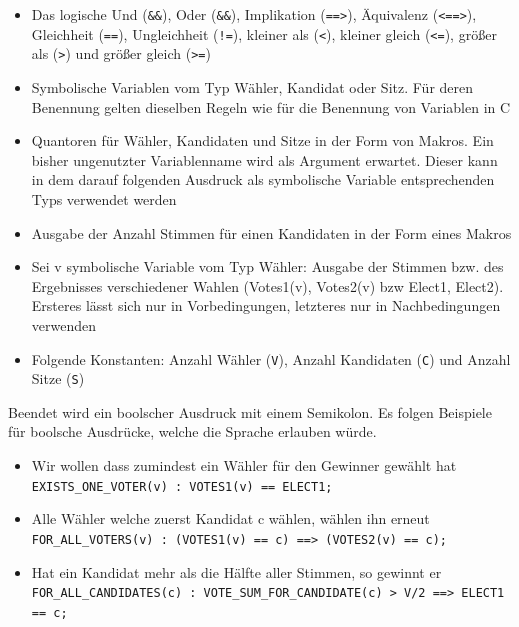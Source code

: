 \documentclass[a4paper]{scrreprt}
\begin{document}
\begin{itemize}
\item Das logische Und (\verb!&&!), Oder (\verb!&&!), Implikation (\verb!==>!), Äquivalenz (\verb!<==>!), Gleichheit (\verb!==!), Ungleichheit (\texttt{!=}), kleiner als (\texttt{<}), kleiner gleich (\texttt{<=}), größer als (\texttt{>}) und größer gleich (\texttt{>=})
\item Symbolische Variablen vom Typ Wähler, Kandidat oder Sitz. Für deren Benennung gelten dieselben Regeln wie für die Benennung von Variablen in C
\item Quantoren für Wähler, Kandidaten und Sitze in der Form von Makros. Ein bisher ungenutzter Variablenname wird als Argument erwartet. Dieser kann in dem darauf folgenden Ausdruck als symbolische Variable entsprechenden Typs verwendet werden
\item Ausgabe der Anzahl Stimmen für einen Kandidaten in der Form eines Makros
\item Sei v symbolische Variable vom Typ Wähler:  Ausgabe der Stimmen bzw. des Ergebnisses verschiedener Wahlen (Votes1(v), Votes2(v) bzw Elect1, Elect2). Ersteres lässt sich nur in Vorbedingungen, letzteres nur in Nachbedingungen verwenden 
\item Folgende Konstanten: Anzahl Wähler (\verb!V!), Anzahl Kandidaten (\verb!C!) und Anzahl Sitze (\verb!S!)
\end{itemize}
Beendet wird ein boolscher Ausdruck mit einem Semikolon. Es folgen Beispiele für boolsche Ausdrücke, welche die Sprache erlauben würde.

\begin{itemize}
\item Wir wollen dass zumindest ein Wähler für den Gewinner gewählt hat \\
\verb!EXISTS_ONE_VOTER(v) : VOTES1(v) == ELECT1;!
\item Alle Wähler welche zuerst Kandidat c wählen, wählen ihn erneut\\
\verb!FOR_ALL_VOTERS(v) : (VOTES1(v) == c) ==> (VOTES2(v) == c);!
\item Hat ein Kandidat mehr als die Hälfte aller Stimmen, so gewinnt er \\
\verb!FOR_ALL_CANDIDATES(c) : VOTE_SUM_FOR_CANDIDATE(c) > V/2 ==> ELECT1 == c;!
\end{itemize}
\end{document}
